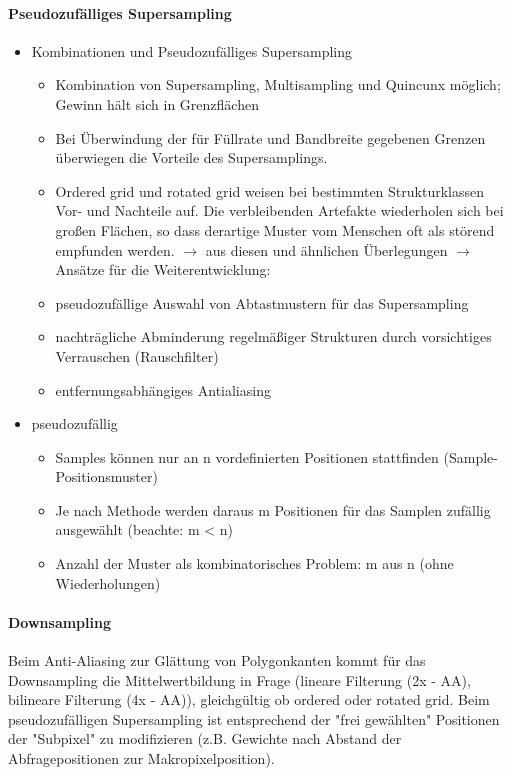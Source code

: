 \documentclass[10pt,landscape]{article}
\begin{document}
\begin{multicols}{3}
\paragraph{Pseudozufälliges Supersampling}
\begin{itemize}
  \item Kombinationen und Pseudozufälliges Supersampling
        \begin{itemize}
          \item Kombination von Supersampling, Multisampling und Quincunx möglich; Gewinn hält sich in Grenzflächen
          \item Bei Überwindung der für Füllrate und Bandbreite gegebenen Grenzen überwiegen die Vorteile des Supersamplings.
          \item Ordered grid und rotated grid weisen bei bestimmten Strukturklassen Vor- und Nachteile auf. Die verbleibenden Artefakte wiederholen sich bei großen Flächen, so dass derartige Muster vom Menschen oft als störend empfunden werden. $\rightarrow$ aus diesen und ähnlichen Überlegungen $\rightarrow$ Ansätze für die Weiterentwicklung:
          \item pseudozufällige Auswahl von Abtastmustern für das Supersampling
          \item nachträgliche Abminderung regelmäßiger Strukturen durch vorsichtiges Verrauschen (Rauschfilter)
          \item entfernungsabhängiges Antialiasing
        \end{itemize}
  \item pseudozufällig
        \begin{itemize}
          \item Samples können nur an n vordefinierten Positionen stattfinden (Sample-Positionsmuster)
          \item Je nach Methode werden daraus m Positionen für das Samplen zufällig ausgewählt (beachte: m < n)
          \item Anzahl der Muster als kombinatorisches Problem: m aus n (ohne Wiederholungen)
        \end{itemize}
\end{itemize}

\paragraph{Downsampling}
Beim Anti-Aliasing zur Glättung von Polygonkanten kommt für das Downsampling die Mittelwertbildung in Frage (lineare Filterung (2x - AA), bilineare Filterung (4x - AA)), gleichgültig ob ordered oder rotated grid. Beim pseudozufälligen Supersampling ist entsprechend der "frei gewählten" Positionen der "Subpixel" zu modifizieren (z.B. Gewichte nach Abstand der Abfragepositionen zur Makropixelposition).



\end{multicols}
\end{document}
